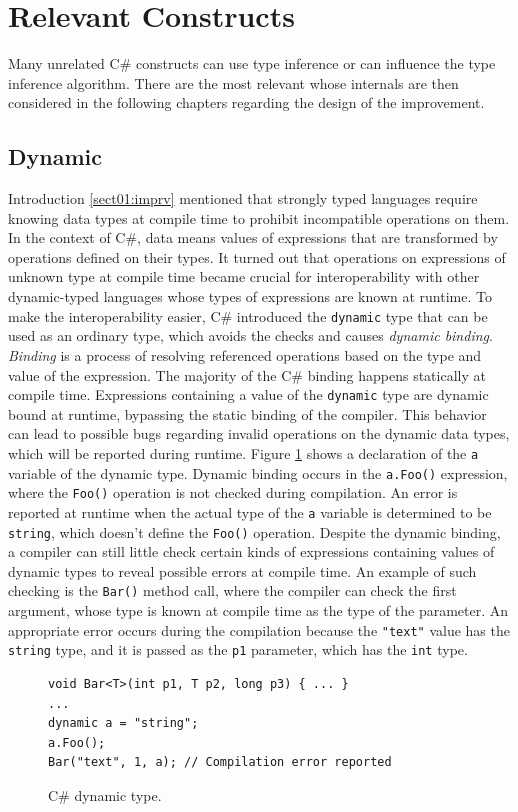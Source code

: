 \section{Relevant Constructs}

Many unrelated C\# constructs can use type inference or can influence the type inference algorithm.
There are the most relevant whose internals are then considered in the following chapters regarding the design of the improvement.

\subsection*{Dynamic} \label{sect15:dyn}

Introduction \ref{sect01:imprv} mentioned that strongly typed languages require knowing data types at compile time to prohibit incompatible operations on them. 
In the context of C\#, data means values of expressions that are transformed by operations defined on their types. 
It turned out that operations on expressions of unknown type at compile time became crucial for interoperability with other dynamic-typed languages whose types of expressions are known at runtime. 
To make the interoperability easier, C\# introduced the \texttt{dynamic} type that can be used as an ordinary type, which avoids the checks and causes \textit{dynamic binding}. 
\textit{Binding} is a process of resolving referenced operations based on the type and value of the expression. 
The majority of the C\# binding happens statically at compile time. Expressions containing a value of the \texttt{dynamic} type are dynamic bound at runtime, bypassing the static binding of the compiler. 
This behavior can lead to possible bugs regarding invalid operations on the dynamic data types, which will be reported during runtime. 
Figure \ref{img06:dynamic} shows a declaration of the \texttt{a} variable of the dynamic type.
Dynamic binding occurs in the \texttt{a.Foo()} expression, where the \texttt{Foo()} operation is not checked during compilation. 
An error is reported at runtime when the actual type of the \texttt{a} variable is determined to be \texttt{string}, which doesn’t define the \texttt{Foo()} operation. Despite the dynamic binding, a compiler can still little check certain kinds of expressions containing values of dynamic types to reveal possible errors at compile time. 
An example of such checking is the \texttt{Bar()} method call, where the compiler can check the first argument, whose type is known at compile time as the type of the parameter. 
An appropriate error occurs during the compilation because the \texttt{"text"} value has the \texttt{string} type, and it is passed as the \texttt{p1} parameter, which has the \texttt{int} type.
\begin{figure}[h]
\begin{lstlisting}[style=csharp]
void Bar<T>(int p1, T p2, long p3) { ... }
...
dynamic a = "string";
a.Foo();
Bar("text", 1, a); // Compilation error reported
\end{lstlisting}
\caption{C\# dynamic type.}
\label{img06:dynamic}
\end{figure}

